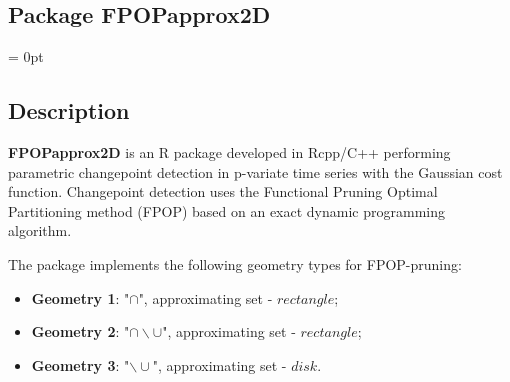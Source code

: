\documentclass{report}
\begin{document}
	\begin{center} \section*{Package FPOPapprox2D}\end{center}

	\parindent = 0pt
	\subsection*{Description}
	
	{\bfseries FPOPapprox2D} is an R package developed in Rcpp/C++ performing parametric changepoint detection in p-variate time series with  the Gaussian cost function. Changepoint detection uses the Functional Pruning Optimal Partitioning method (FPOP) based on an exact dynamic programming algorithm.
	
	The package implements the following geometry types for FPOP-pruning:
	\begin{itemize}
		\item {\bfseries Geometry 1}:  "$\cap$", approximating set - $rectangle$;
		\item {\bfseries Geometry 2}: "$\cap \backslash \cup$",  approximating set - $rectangle$;
		\item {\bfseries Geometry 3}: "$\backslash \cup$",  approximating set - $disk$.
	\end{itemize}	
\end{document}
